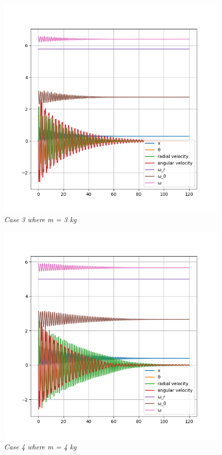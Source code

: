 \begin{figure}[H]
    \centering
    \includegraphics[width=15cm]{SimPictures/m3.png}
    \caption{\textit{Case 3 where m = 3 kg}}
    \label{}
\end{figure}
        
\begin{figure}[H]
    \centering
    \includegraphics[width=15cm]{SimPictures/m4.png}
    \caption{\textit{Case 4 where m = 4 kg}}
    \label{}
\end{figure}
        
